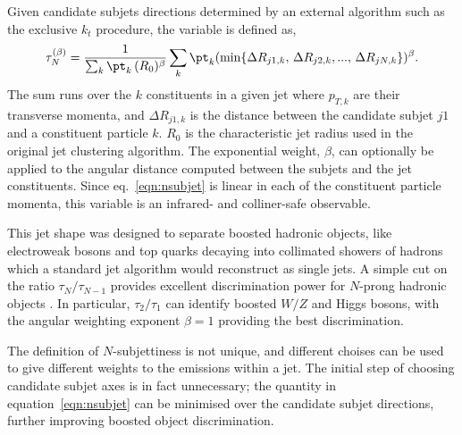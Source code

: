 Given candidate subjets directions determined by an external algorithm such as the exclusive $k_t$ procedure, the variable is defined as,
%
\begin{equation} 
\tau^{(\beta)}_N = \frac{1}{\sum_k {\pt}_k\,(R_0)^{\beta}} \sum_k {\pt}_k (\min \{ \Delta R_{j1,k},\,\Delta R_{j2,k},...,\,\Delta R_{jN,k} \})^{\beta}.
\label{eqn:nsubjet}
\end{equation} 
%
The sum runs over the $k$ constituents in a given jet where $p_{T,k}$ are their transverse momenta, and $\Delta R_{j1,k}$ is the distance between the candidate subjet $j1$ and a constituent particle $k$.  $R_0$ is the characteristic jet radius used in the original jet clustering algorithm.  The exponential weight, $\beta$, can optionally be applied to the angular distance computed between the subjets and the jet constituents.   
Since eq.~\ref{eqn:nsubjet} is linear in each of the constituent particle momenta, this variable is an infrared- and colliner-safe observable.


This jet shape was designed to separate boosted hadronic objects, like electroweak bosons and top quarks decaying into collimated showers of hadrons which a standard jet algorithm would reconstruct as single jets. %
A simple cut on the ratio $\tau_N/\tau_{N-1}$ provides excellent discrimination power for $N$-prong hadronic objects\cite{nsubjettiness} . In particular, $\tau_2/\tau_1$ can identify boosted $W/Z$ and Higgs bosons, with the angular weighting exponent $\beta =1$ providing the best discrimination.

The definition of $N$-subjettiness is not unique, and different choises can be used to give different weights to the emissions within a jet. The initial step of choosing candidate subjet axes is in fact unnecessary; the quantity in equation~\ref{eqn:nsubjet} can be minimised over the candidate subjet directions, further improving boosted object discrimination.

